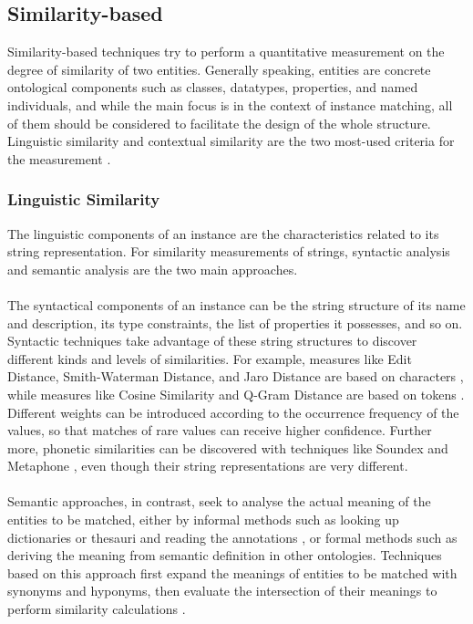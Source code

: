 \subsection{Similarity-based}

Similarity-based techniques try to perform a quantitative measurement on the degree of similarity of two entities. Generally speaking, entities are concrete ontological components such as classes, datatypes, properties, and named individuals, and while the main focus is in the context of instance matching, all of them should be considered to facilitate the design of the whole structure. Linguistic similarity and contextual similarity are the two most-used criteria for the measurement \cite{DBLP:conf/ic3k/Nguyen015}.

\subsubsection{Linguistic Similarity}

The linguistic components of an instance are the characteristics related to its string representation. For similarity measurements of strings, syntactic analysis and semantic analysis are the two main approaches.
\\\\
The syntactical components of an instance can be the string structure of its name and description, its type constraints, the list of properties it possesses, and so on. Syntactic techniques take advantage of these string structures to discover different kinds and levels of similarities. For example, measures like Edit Distance, Smith-Waterman Distance, and Jaro Distance are based on characters \cite{DBLP:journals/corr/SekerAAM14,DBLP:journals/algorithmica/FaroMP20}, while measures like Cosine Similarity and Q-Gram Distance are based on tokens \cite{DBLP:conf/wea/KobayashiHYS20}. Different weights can be introduced according to the occurrence frequency of the values, so that matches of rare values can receive higher confidence. Further more, phonetic similarities can be discovered with techniques like Soundex \cite{DBLP:journals/corr/BhattiWIHS14} and Metaphone \cite{DBLP:conf/cicling/JordaoR12}, even though their string representations are very different.
\\\\
Semantic approaches, in contrast, seek to analyse the actual meaning of the entities to be matched, either by informal methods such as looking up dictionaries or thesauri and reading the annotations \cite{DBLP:journals/corr/abs-0907-2209,DBLP:conf/ifip12/LinS08,DBLP:conf/esws/Vennesland15}, or formal methods such as deriving the meaning from semantic definition in other ontologies. Techniques based on this approach first expand the meanings of entities to be matched with synonyms and hyponyms, then evaluate the intersection of their meanings to perform similarity calculations \cite{DBLP:conf/ieaaie/AssiMD19}.

